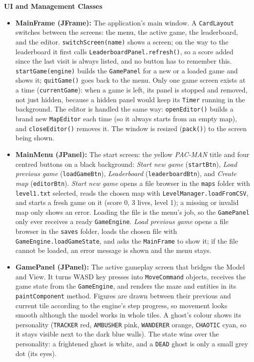 \documentclass[11pt, a4paper]{article}
\begin{document}
\vspace{0.3cm}
\textbf{UI and Management Classes}
\begin{itemize}
    \item \textbf{MainFrame (JFrame):} The application's main window. A \texttt{CardLayout} switches between the screens: the menu, the active game, the leaderboard, and the editor. \texttt{switchScreen(name)} shows a screen; on the way to the leaderboard it first calls \texttt{LeaderboardPanel.refresh()}, so a score added since the last visit is always listed, and no button has to remember this. \texttt{startGame(engine)} builds the \texttt{GamePanel} for a new or a loaded game and shows it; \texttt{quitGame()} goes back to the menu. Only one game screen exists at a time (\texttt{currentGame}): when a game is left, its panel is stopped and removed, not just hidden, because a hidden panel would keep its \texttt{Timer} running in the background. The editor is handled the same way: \texttt{openEditor()} builds a brand new \texttt{MapEditor} each time (so it always starts from an empty map), and \texttt{closeEditor()} removes it. The window is resized (\texttt{pack()}) to the screen being shown.
    \item \textbf{MainMenu (JPanel):} The start screen: the yellow \textit{PAC-MAN} title and four centred buttons on a black background: \textit{Start new game} (\texttt{startBtn}), \textit{Load previous game} (\texttt{loadGameBtn}), \textit{Leaderboard} (\texttt{leaderboardBtn}), and \textit{Create map} (\texttt{editorBtn}). \textit{Start new game} opens a file browser in the \texttt{maps} folder with \texttt{level1.txt} selected, reads the chosen map with \texttt{LevelManager.loadFromCSV}, and starts a fresh game on it (score 0, 3 lives, level 1); a missing or invalid map only shows an error. Loading the file is the menu's job, so the \texttt{GamePanel} only ever receives a ready \texttt{GameEngine}. \textit{Load previous game} opens a file browser in the \texttt{saves} folder, loads the chosen file with \texttt{GameEngine.loadGameState}, and asks the \texttt{MainFrame} to show it; if the file cannot be loaded, an error message is shown and the menu stays.
    \item \textbf{GamePanel (JPanel):} The active gameplay screen that bridges the Model and View. It turns WASD key presses into \texttt{MoveCommand} objects, receives the game state from the \texttt{GameEngine}, and renders the maze and entities in its \texttt{paintComponent} method. Figures are drawn between their previous and current tile according to the engine's step progress, so movement looks smooth although the model works in whole tiles. A ghost's colour shows its personality (\texttt{TRACKER} red, \texttt{AMBUSHER} pink, \texttt{WANDERER} orange, \texttt{CHAOTIC} cyan, so it stays visible next to the dark blue walls). The state wins over the personality: a frightened ghost is white, and a \texttt{DEAD} ghost is only a small grey dot (its eyes).

\end{itemize}
\end{document}
